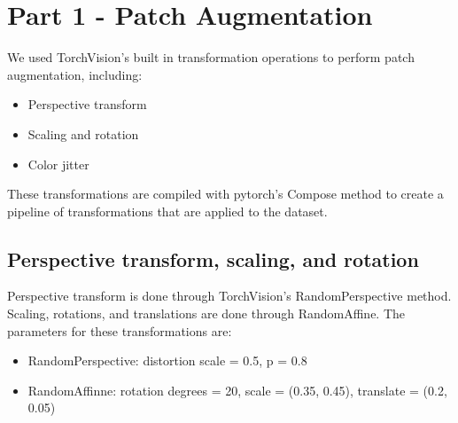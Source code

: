 \documentclass[conference]{IEEEtran}
\begin{document}




\maketitle





%
\IEEEpeerreviewmaketitle

\section{Part 1 - Patch Augmentation}
We used TorchVision's built in transformation operations to perform patch augmentation, including:
\begin{itemize}
  \item Perspective transform
  \item Scaling and rotation
  \item Color jitter
\end{itemize}

These transformations are compiled with pytorch's Compose method to create a pipeline of transformations that are applied to the dataset.

\subsection{Perspective transform, scaling, and rotation}
Perspective transform is done through TorchVision's RandomPerspective method. Scaling, rotations, and translations are done through RandomAffine. The parameters for these transformations are:
\begin{itemize}
  \item RandomPerspective: distortion scale = 0.5, p = 0.8
  \item RandomAffinne: rotation degrees = 20, scale = (0.35, 0.45), translate = (0.2, 0.05)
\end{itemize}
\end{document}
